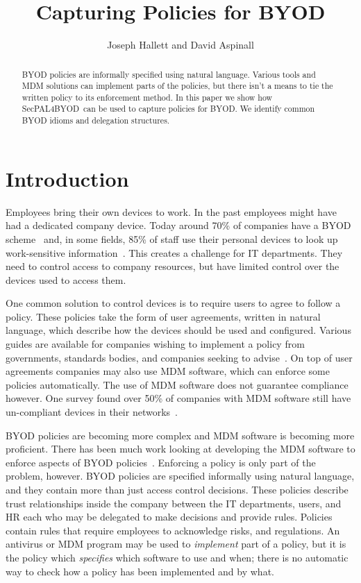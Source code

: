 \documentclass{llncs}
\title{Capturing Policies for BYOD}
\author{Joseph Hallett and David Aspinall}
\institute{University of Edinburgh}
\newcommand{\AppPAL}[0]{SecPAL4BYOD}
\begin{document}
\maketitle

\begin{abstract}
  BYOD policies are informally specified using natural language.
  Various tools and \ac{MDM} solutions can implement parts of the policies, but there isn't a means to tie the written policy to its enforcement method.
  In this paper we show how \AppPAL~can be used to capture policies for BYOD.
  We identify common BYOD idioms and delegation structures.
\end{abstract}

\section{Introduction}
\label{sec:intro}

Employees bring their own devices to work.
In the past employees might have had a dedicated company device.
Today around 70\% of companies have a BYOD scheme~\cite{schulze_byod_2016} and, in some fields,
  85\% of staff use their personal devices to look up work-sensitive information~\cite{patel_uk_2015}.
This creates a challenge for IT departments.
They need to control access to company resources, but have limited control over the devices used to access them.

One common solution to control devices is to require users to agree to follow a policy.
These policies take the form of user agreements, written in natural language, which describe how the devices should be used and configured.
Various guides are available for companies wishing to implement a policy from governments, standards bodies, and companies seeking to advise~\cite{nicholas_r._c._guerin_security_2008,souppaya_guidelines_????,hp_byod_????,cesg_byod_2015}.
On top of user agreements companies may also use \ac{MDM} software, which can enforce some policies automatically.
The use of \ac{MDM} software does not guarantee compliance however.
One survey found over 50\% of companies with \ac{MDM} software still have un-compliant devices in their networks~\cite{mobileiron_security_labs_q4_2015}.

BYOD policies are becoming more complex and \ac{MDM} software is becoming more proficient.
There has been much work looking at developing the \ac{MDM} software to enforce aspects of BYOD policies~\cite{costantino_towards_2013,martinelli_enhancing_2016,armando_enabling_2014}.
Enforcing a policy is only part of the problem, however.
BYOD policies are specified informally using natural language, and they contain more than just access control decisions.
These policies describe trust relationships inside the company between the IT departments, users, and HR each who may be delegated to make decisions and provide rules.
Policies contain rules that require employees to acknowledge risks, and regulations.
An antivirus or \ac{MDM} program may be used to \emph{implement} part of a policy, but it is the policy which \emph{specifies} which software to use and when; there is no automatic way to check how a policy has been implemented and by what.
\end{document}

